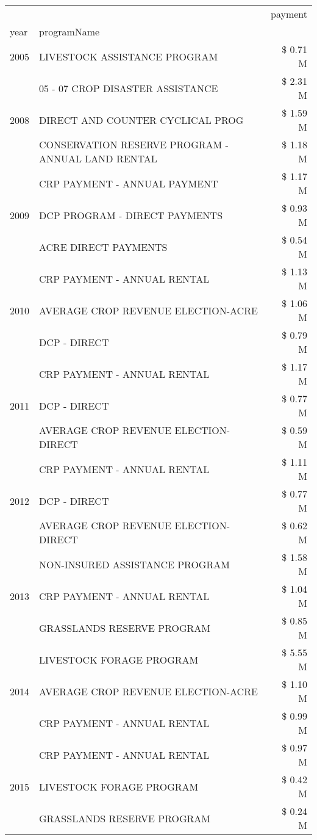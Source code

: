 \begin{tabular}{llr}
\toprule
 &  & payment \\
year & programName &  \\
\midrule
2005 & LIVESTOCK ASSISTANCE PROGRAM & \$ 0.71 M \\
\cline{1-3}
\multirow[t]{3}{*}{2008} & 05 - 07 CROP DISASTER ASSISTANCE & \$ 2.31 M \\
 & DIRECT AND COUNTER CYCLICAL PROG & \$ 1.59 M \\
 & CONSERVATION RESERVE PROGRAM - ANNUAL LAND RENTAL & \$ 1.18 M \\
\cline{1-3}
\multirow[t]{3}{*}{2009} & CRP PAYMENT - ANNUAL PAYMENT & \$ 1.17 M \\
 & DCP PROGRAM - DIRECT PAYMENTS & \$ 0.93 M \\
 & ACRE DIRECT PAYMENTS & \$ 0.54 M \\
\cline{1-3}
\multirow[t]{3}{*}{2010} & CRP PAYMENT - ANNUAL RENTAL & \$ 1.13 M \\
 & AVERAGE CROP REVENUE ELECTION-ACRE & \$ 1.06 M \\
 & DCP - DIRECT & \$ 0.79 M \\
\cline{1-3}
\multirow[t]{3}{*}{2011} & CRP PAYMENT - ANNUAL RENTAL & \$ 1.17 M \\
 & DCP - DIRECT & \$ 0.77 M \\
 & AVERAGE CROP REVENUE ELECTION-DIRECT & \$ 0.59 M \\
\cline{1-3}
\multirow[t]{3}{*}{2012} & CRP PAYMENT - ANNUAL RENTAL & \$ 1.11 M \\
 & DCP - DIRECT & \$ 0.77 M \\
 & AVERAGE CROP REVENUE ELECTION-DIRECT & \$ 0.62 M \\
\cline{1-3}
\multirow[t]{3}{*}{2013} & NON-INSURED ASSISTANCE PROGRAM & \$ 1.58 M \\
 & CRP PAYMENT - ANNUAL RENTAL & \$ 1.04 M \\
 & GRASSLANDS RESERVE PROGRAM & \$ 0.85 M \\
\cline{1-3}
\multirow[t]{3}{*}{2014} & LIVESTOCK FORAGE PROGRAM & \$ 5.55 M \\
 & AVERAGE CROP REVENUE ELECTION-ACRE & \$ 1.10 M \\
 & CRP PAYMENT - ANNUAL RENTAL & \$ 0.99 M \\
\cline{1-3}
\multirow[t]{3}{*}{2015} & CRP PAYMENT - ANNUAL RENTAL & \$ 0.97 M \\
 & LIVESTOCK FORAGE PROGRAM & \$ 0.42 M \\
 & GRASSLANDS RESERVE PROGRAM & \$ 0.24 M \\

\end{tabular}
